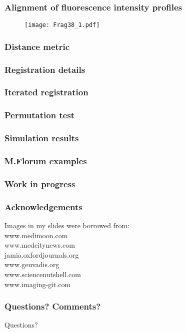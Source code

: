 \documentclass[10pt,dvipsnames,table, notes]{beamer}
\begin{document}
\begin{frame}
\frametitle{Alignment of fluorescence intensity profiles}
\begin{figure}
\texttt{[image: Frag38\_1.pdf]}
\end{figure}
\end{frame}

\begin{frame}
\frametitle{Distance metric}

\end{frame}

\begin{frame}
\frametitle{Registration details}

\end{frame}

\begin{frame}
\frametitle{Iterated registration}

\end{frame}

\begin{frame}
\frametitle{Permutation test}

\end{frame}

\begin{frame}
\frametitle{Simulation results}

\end{frame}

\begin{frame}
\frametitle{M.Florum examples}

\end{frame}

\begin{frame}
\frametitle{Work in progress}

\end{frame}

\begin{frame}
\frametitle{Acknowledgements}
Images in my slides were borrowed from: \\
www.medimoon.com \\
www.medcitynews.com \\
jamia.oxfordjournals.org \\
www.geuvadis.org \\
www.sciencenutshell.com \\
www.imaging-git.com \\

\end{frame}

\begin{frame}
\frametitle{Questions? Comments?}
Questions?
\end{frame}
\end{document}

